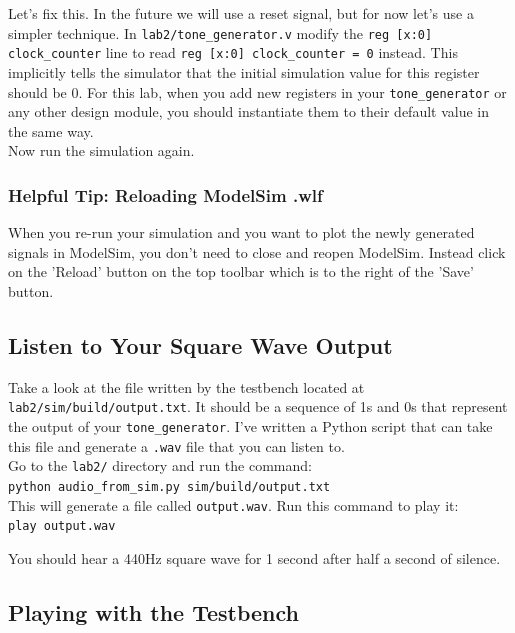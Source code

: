 \documentclass[11pt]{article}
\begin{document}
Let's fix this. In the future we will use a reset signal, but for now let's use a simpler technique. In \verb|lab2/tone_generator.v| modify the \verb|reg [x:0] clock_counter| line to read \verb|reg [x:0] clock_counter = 0| instead. This implicitly tells the simulator that the initial simulation value for this register should be 0. For this lab, when you add new registers in your \verb|tone_generator| or any other design module, you should instantiate them to their default value in the same way.\\

Now run the simulation again.

\subsubsection{Helpful Tip: Reloading ModelSim .wlf}

When you re-run your simulation and you want to plot the newly generated signals in ModelSim, you don't need to close and reopen ModelSim. Instead click on the 'Reload' button on the top toolbar which is to the right of the 'Save' button.

\subsection{Listen to Your Square Wave Output}

Take a look at the file written by the testbench located at \verb|lab2/sim/build/output.txt|. It should be a sequence of 1s and 0s that represent the output of your \verb|tone_generator|. I've written a Python script that can take this file and generate a \verb|.wav| file that you can listen to.\\

Go to the \verb|lab2/| directory and run the command:\\

\verb|python audio_from_sim.py sim/build/output.txt|\\

This will generate a file called \verb|output.wav|. Run this command to play it:\\

\verb|play output.wav|

You should hear a 440Hz square wave for 1 second after half a second of silence.

\subsection{Playing with the Testbench}
\end{document}
